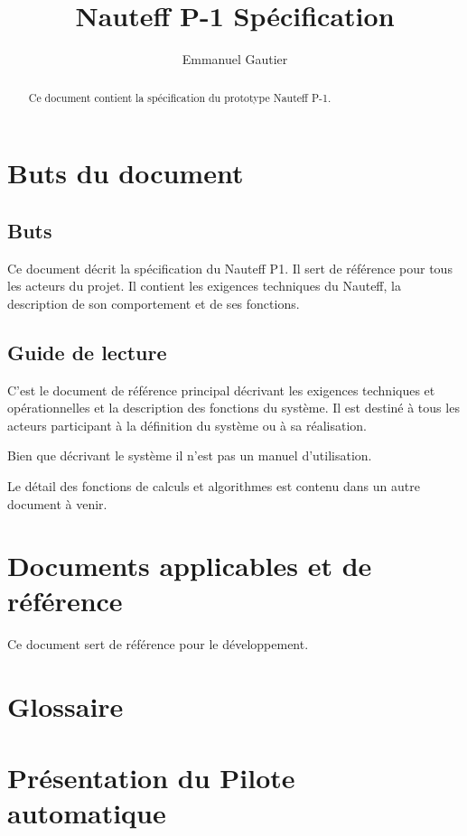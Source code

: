 \documentclass[a4paper,11pt]{report}
\title{Nauteff P-1 Spécification}
\author{Emmanuel Gautier}
\begin{document}
\maketitle


\begin{abstract}
Ce document contient la spécification du prototype Nauteff P-1.
\end{abstract}

\tableofcontents
\listoftables
\listoffigures


\chapter{Buts du document}
\section{Buts}
Ce document décrit la spécification du Nauteff P1. Il sert de référence
pour tous les acteurs du projet.
Il contient les exigences techniques du Nauteff,
la description de son comportement et de ses fonctions. 

\section{Guide de lecture}
C'est le document de référence principal décrivant
les exigences techniques et opérationnelles et la description
des fonctions du système. Il est destiné à tous les acteurs
participant à la définition du système ou à sa réalisation.

Bien que décrivant le système il n'est pas un manuel d'utilisation.

Le détail des fonctions de calculs et algorithmes est contenu
dans un autre document à venir.

\chapter{Documents applicables et de référence}

Ce document sert de référence pour le développement.

\printbibliography[heading=none]

\chapter{Glossaire}

\printglossary

\chapter{Présentation du Pilote automatique}
\end{document}
